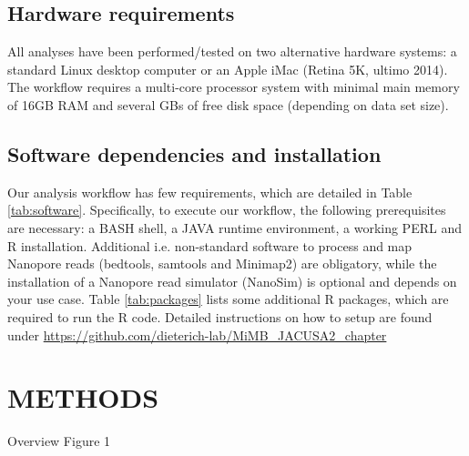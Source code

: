\documentclass[times, 11pt, a4paper]{article}
\begin{document}
\subsection*{Hardware requirements}
All analyses have been performed/tested on two alternative hardware systems:
a standard Linux desktop computer or an Apple iMac (Retina 5K, ultimo 2014).
The workflow requires a multi-core processor system with minimal main memory of 16GB RAM
and several GBs of free disk space (depending on data set size).

\subsection*{Software dependencies and installation}
Our analysis workflow has few requirements, which are detailed in Table \ref{tab:software}. Specifically, to execute our workflow, the following prerequisites are necessary: a BASH shell, a JAVA runtime environment, a working PERL and R installation. Additional i.e. non-standard software to process and map Nanopore reads (bedtools, samtools and Minimap2) are obligatory, while the installation of a Nanopore read simulator (NanoSim) is optional and depends on your use case. Table \ref{tab:packages} lists some additional R packages, which are required to run the R code. Detailed instructions on how to setup are found under \url{https://github.com/dieterich-lab/MiMB_JACUSA2_chapter} 

\section*{METHODS}
Overview Figure 1
\end{document}
